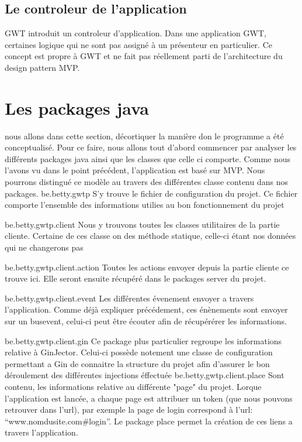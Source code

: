\subsection{Le controleur de l'application} 
GWT introduit un controleur d'application. Dans une application GWT, certaines logique qui ne sont pas assigné à un présenteur en particulier. Ce concept est propre à GWT et ne fait pas réellement parti de l'architecture du design pattern MVP. 
 
\section{Les packages java}
nous allons dans cette section, décortiquer la manière don le programme a été conceptualisé. Pour ce faire, nous allons tout d'abord commencer par analyser les différents packages java ainsi que les classes que celle ci comporte. Comme nous l'avons vu dans le point précédent, l'application est basé sur MVP. Nous pourrons distingué ce modèle au travers des différentes classe contenu dans nos packages.
be.betty.gwtp
	S'y trouve le fichier de configuration du projet. Ce fichier comporte l'ensemble des informations utilies au bon fonctionnement du projet

be.betty.gwtp.client
	Nous y trouvons toutes les classes utilitaires de la partie cliente. Certaine de ces classe on des méthode statique, celle-ci étant nos données qui ne changerons pas 

be.betty.gwtp.client.action
	Toutes les actions envoyer depuis la partie cliente ce trouve ici. Elle seront ensuite récupéré dans le packages server du projet.

be.betty.gwtp.client.event
	Les différentes évenement envoyer a travers l'application. Comme déjà expliquer précédement, ces énènements sont envoyer sur un busevent, celui-ci peut être écouter afin de récupérérer les informations.

be.betty.gwtp.client.gin
	Ce package plus particulier regroupe les informations relative à GinJector. Celui-ci possède notement une classe de configuration permettant a Gin de connaitre la structure du projet afin d'assurer le bon déroulement des différentes injections éffectuée
be.betty.gwtp.client.place
Sont contenu, les informations relative au différente "page" du projet. Lorque l'application est lancée, a chaque page est attribuer un token (que nous pouvons retrouver dans l'url), par exemple la page de login correspond à l'url: \enquote{www.nomdusite.com#login}. Le package place permet la création de ces liens a travers l'application.

